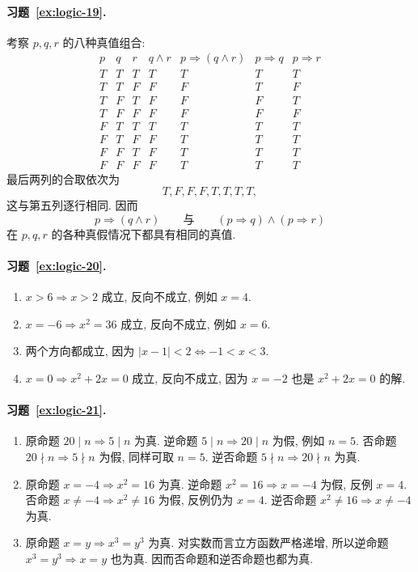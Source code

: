 \documentclass[usesamecnt, thmcnt=section, lang=cn, newtx, 10pt, scheme=chinese]{elegantbook}
\begin{document}
\paragraph*{习题~\ref{ex:logic-19}.}
考察 $p,q,r$ 的八种真值组合:
\[
\begin{array}{c|c|c|c|c|c|c}
p&q&r&q\wedge r&p\Rightarrow(q\wedge r)&p\Rightarrow q&p\Rightarrow r\\
\hline
T&T&T&T&T&T&T\\
T&T&F&F&F&T&F\\
T&F&T&F&F&F&T\\
T&F&F&F&F&F&F\\
F&T&T&T&T&T&T\\
F&T&F&F&T&T&T\\
F&F&T&F&T&T&T\\
F&F&F&F&T&T&T
\end{array}
\]
最后两列的合取依次为
\[
 T,F,F,F,T,T,T,T,
\]
这与第五列逐行相同. 因而
\[
 p\Rightarrow(q\wedge r)
 \qquad\text{与}\qquad
 (p\Rightarrow q)\wedge(p\Rightarrow r)
\]
在 $p,q,r$ 的各种真假情况下都具有相同的真值.

\paragraph*{习题~\ref{ex:logic-20}.}
\begin{enumerate}[label=\rm(\arabic*)]
  \item $x>6\Rightarrow x>2$ 成立, 反向不成立, 例如 $x=4$.
  \item $x=-6\Rightarrow x^2=36$ 成立, 反向不成立, 例如 $x=6$.
  \item 两个方向都成立, 因为 $|x-1|<2\Leftrightarrow-1<x<3$.
  \item $x=0\Rightarrow x^2+2x=0$ 成立, 反向不成立, 因为 $x=-2$ 也是 $x^2+2x=0$ 的解.
\end{enumerate}

\paragraph*{习题~\ref{ex:logic-21}.}
\begin{enumerate}[label=\rm(\arabic*)]
  \item 原命题 $20\mid n\Rightarrow5\mid n$ 为真. 逆命题 $5\mid n\Rightarrow20\mid n$ 为假, 例如 $n=5$. 否命题 $20\nmid n\Rightarrow5\nmid n$ 为假, 同样可取 $n=5$. 逆否命题 $5\nmid n\Rightarrow20\nmid n$ 为真.
  \item 原命题 $x=-4\Rightarrow x^2=16$ 为真. 逆命题 $x^2=16\Rightarrow x=-4$ 为假, 反例 $x=4$. 否命题 $x\neq-4\Rightarrow x^2\neq16$ 为假, 反例仍为 $x=4$. 逆否命题 $x^2\neq16\Rightarrow x\neq-4$ 为真.
  \item 原命题 $x=y\Rightarrow x^3=y^3$ 为真. 对实数而言立方函数严格递增, 所以逆命题 $x^3=y^3\Rightarrow x=y$ 也为真. 因而否命题和逆否命题也都为真.
\end{enumerate}
\end{document}

